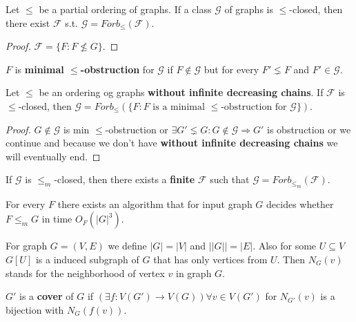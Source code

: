 \begin{lemma}
	Let $\leq$ be a partial ordering of graphs. If a class $\mathcal{G}$ of graphs is $\leq$-closed, then there exist $\mathcal{F}$ s.t. $\mathcal{G} = Forb_{\leq}(\mathcal{F})$.
\end{lemma}

\begin{proof}
	$\mathcal{F} = \{F : F \nleq G\}$.
\end{proof}

\begin{defn}
	$F$ is \textbf{minimal $\leq$-obstruction} for $\mathcal{G}$ if $F \notin \mathcal{G}$ but for every $F' \lneq F$ and $F' \in \mathcal{G}$.
\end{defn}

\begin{lemma}
	Let $\leq$ be an ordering og graphs \textbf{without infinite decreasing chains}. If $\mathcal{F}$ is $\leq$-closed, then $\mathcal{G} = Forb_{\leq}(\{F : F \text{ is a minimal } \leq\text{-obstruction for } \mathcal{G}\})$.
\end{lemma}

\begin{proof}
	$G \notin \mathcal{G}$ is min $\leq$-obstruction or $\exists G' \lneq G : G \notin \mathcal{G} \Rightarrow G'$ is obstruction or we continue and because we don't have \textbf{without infinite decreasing chains} we will eventually end.
\end{proof}

If $\mathcal{G}$ is $\leq_{m}$-closed, then there exists a \textbf{finite} $\mathcal{F}$ such that $\mathcal{G} = Forb_{\leq_{m}}(\mathcal{F})$.

\begin{thm}
	For every $F$ there exists an algorithm that for input graph $G$ decides whether $F \leq_{m} G$ in time $O_{F}(|G|^{3})$.
\end{thm}

\begin{defn}
	For graph $G = (V,E)$ we define $|G| = |V|$ and $||G|| = |E|$. Also for some $U \subseteq V$ $G[U]$ is a induced subgraph of $G$ that has only vertices from $U$. Then $N_{G}(v)$ stands for the neighborhood of vertex $v$ in graph $G$.
\end{defn}

\begin{defn}
	$G'$ is a \textbf{cover} of $G$ if $(\exists f : V(G') \to V(G)) \forall v \in V(G')$ for $N_{G'}(v)$ is a bijection with $N_{G}(f(v))$.
\end{defn}

